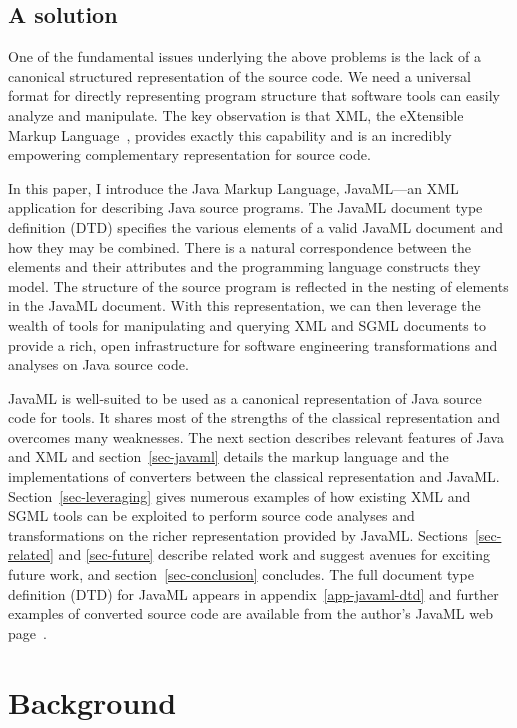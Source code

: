 \documentclass{article}
\begin{document}
\begin{multicols}{2}
\subsection{A solution}

One of the fundamental issues underlying the above problems is the
lack of a canonical structured representation of the source code.  We
need a universal format for directly representing program structure that
software tools can easily analyze and manipulate.  The key observation
is that XML, the eXtensible Markup Language~\cite{XML}, provides exactly
this capability and is an incredibly empowering complementary
representation for source code.

In this paper, I introduce the Java Markup Language, JavaML---an XML
application for describing Java source programs.  The JavaML document
type definition (DTD) specifies the various elements of a valid JavaML
document and how they may be combined.  There is a natural
correspondence between the elements and their attributes and the
programming language constructs they model.  The structure of the source
program is reflected in the nesting of elements in the JavaML document.
With this representation, we can then leverage the wealth of tools for
manipulating and querying XML and SGML documents to provide a rich, open
infrastructure for software engineering transformations and analyses on
Java source code.

JavaML is well-suited to be used as a canonical representation of Java
source code for tools.  It shares most of the strengths of the classical
representation and overcomes many weaknesses.  The next section
describes relevant features of Java and XML and section~\ref{sec-javaml}
details the markup language and the implementations of converters between
the classical representation and JavaML.  Section~\ref{sec-leveraging}
gives numerous examples of how existing XML and SGML tools can be
exploited to perform source code analyses and transformations on the
richer representation provided by JavaML.  Sections~\ref{sec-related}
and \ref{sec-future} describe related work and suggest avenues for
exciting future work, and section~\ref{sec-conclusion} concludes.  The
full document type definition (DTD) for JavaML appears in
appendix~\ref{app-javaml-dtd} and further examples of converted source
code are available from the author's JavaML web page~\cite{Badros-javaml}.

\section{Background}
\label{sec-background}


\end{multicols}
\end{document}
